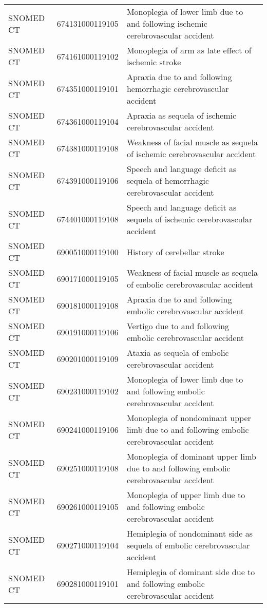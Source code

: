 \begin{longtable}{p{}p{}p{}}
  SNOMED CT & 674131000119105 & Monoplegia of lower limb due to and following ischemic cerebrovascular accident \\ 
  SNOMED CT & 674161000119102 & Monoplegia of arm as late effect of ischemic stroke \\ 
  SNOMED CT & 674351000119101 & Apraxia due to and following hemorrhagic cerebrovascular accident \\ 
  SNOMED CT & 674361000119104 & Apraxia as sequela of ischemic cerebrovascular accident \\ 
  SNOMED CT & 674381000119108 & Weakness of facial muscle as sequela of ischemic cerebrovascular accident \\ 
  SNOMED CT & 674391000119106 & Speech and language deficit as sequela of hemorrhagic cerebrovascular accident \\ 
  SNOMED CT & 674401000119108 & Speech and language deficit as sequela of ischemic cerebrovascular accident \\ 
  SNOMED CT & 690051000119100 & History of cerebellar stroke \\ 
  SNOMED CT & 690171000119105 & Weakness of facial muscle as sequela of embolic cerebrovascular accident \\ 
  SNOMED CT & 690181000119108 & Apraxia due to and following embolic cerebrovascular accident \\ 
  SNOMED CT & 690191000119106 & Vertigo due to and following embolic cerebrovascular accident \\ 
  SNOMED CT & 690201000119109 & Ataxia as sequela of embolic cerebrovascular accident \\ 
  SNOMED CT & 690231000119102 & Monoplegia of lower limb due to and following embolic cerebrovascular accident \\ 
  SNOMED CT & 690241000119106 & Monoplegia of nondominant upper limb due to and following embolic cerebrovascular accident \\ 
  SNOMED CT & 690251000119108 & Monoplegia of dominant upper limb due to and following embolic cerebrovascular accident \\ 
  SNOMED CT & 690261000119105 & Monoplegia of upper limb due to and following embolic cerebrovascular accident \\ 
  SNOMED CT & 690271000119104 & Hemiplegia of nondominant side as sequela of embolic cerebrovascular accident \\ 
  SNOMED CT & 690281000119101 & Hemiplegia of dominant side due to and following embolic cerebrovascular accident \\ 

\end{longtable}
